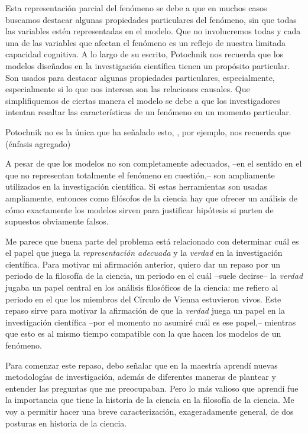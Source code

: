 Esta representación parcial del fenómeno se debe a que en muchos
casos buscamos destacar algunas propiedades particulares del
fenómeno, sin que todas las variables estén representadas en el
modelo. Que no involucremos todas y cada una de las variables que
afectan el fenómeno es un reflejo de nuestra limitada capacidad
cognitiva. A lo largo de su escrito, Potochnik nos recuerda que los
modelos diseñados en la investigación científica tienen un propósito
particular. Son usados para destacar algunas propiedades
particulares, especialmente, especialmente si lo que nos interesa son
las relaciones causales. Que simplifiquemos de ciertas manera el
modelo se debe a que los investigadores intentan resaltar las
características de un fenómeno en un momento particular.

Potochnik no es la única que ha señalado esto,
\textcite[][p.24]{abrams2023evolution}, por ejemplo, nos recuerda que
 (énfasis agregado)

A pesar de que los modelos no son completamente adecuados, --en el
sentido en el que no representan totalmente el fenómeno en
cuestión,-- son ampliamente utilizados en la investigación
científica. Si estas herramientas son usadas ampliamente, entonces
como filósofos de la ciencia hay que ofrecer un análisis de cómo
exactamente los modelos sirven para justificar hipótesis si parten de
supuestos obviamente falsos.

Me parece que buena parte del problema está relacionado con
determinar cuál es el papel que juega la \emph{representación
 adecuada} y la \emph{verdad} en la investigación científica. Para
motivar mi afirmación anterior, quiero dar un repaso por un periodo
de la filosofía de la ciencia, un periodo en el cuál --suele
decirse-- la \emph{verdad} jugaba un papel central en los análisis
filosóficos de la ciencia: me refiero al periodo en el que los
miembros del Círculo de Vienna estuvieron vivos. Este repaso sirve
para motivar la afirmación de que la \emph{verdad} juega un papel en
la investigación científica --por el momento no asumiré cuál es ese
papel,-- mientras que esto es al mismo tiempo compatible con la
 que hacen los modelos de un fenómeno.

Para comenzar este repaso, debo señalar que en la maestría aprendí
nuevas metodologías de investigación, además de diferentes maneras de
plantear y entender las preguntas que me preocupaban. Pero lo más
valioso que aprendí fue la importancia que tiene la historia de la
ciencia en la filosofía de la ciencia. Me voy a permitir hacer una
breve caracterización, exageradamente general, de dos posturas en
historia de la ciencia.

